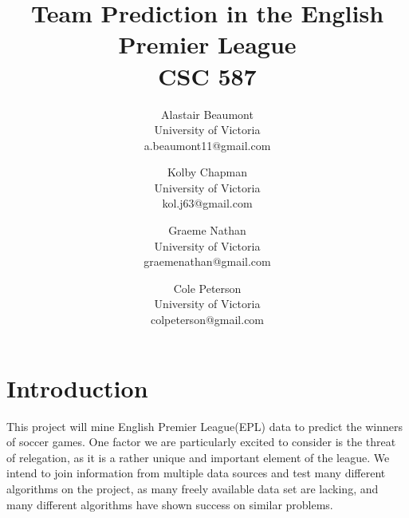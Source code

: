\documentclass[conference]{IEEEtran}
\begin{document}
%

\title{Team Prediction in the English Premier League\\ {\large CSC 587}}

\author{%
  Alastair Beaumont\\University of Victoria\\a.beaumont11@gmail.com
  \and Kolby Chapman\\University of Victoria\\kol.j63@gmail.com
  \and Graeme Nathan\\University of Victoria\\graemenathan@gmail.com
  \and Cole Peterson\\University of Victoria\\colpeterson@gmail.com
}

\maketitle

\IEEEpeerreviewmaketitle

\section{Introduction}
This project will mine English Premier League(EPL) data to predict the winners of soccer games. One factor we are particularly excited to consider is the threat of relegation, as it is a rather unique and important element of the league. We intend to join information from multiple data sources and test many different algorithms on the project, as many freely available data set are lacking, and many different algorithms have shown success on similar problems.
\end{document}
